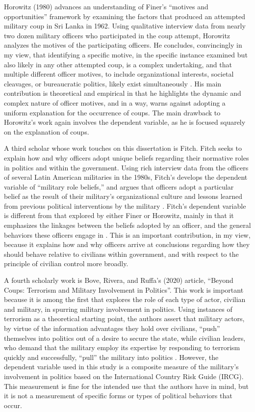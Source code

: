 \documentclass[
  12pt,
  oneside]{memoir}
\begin{document}
Horowitz (1980) advances an understanding of Finer's ``motives and opportunities'' framework by examining the factors that produced an attempted military coup in Sri Lanka in 1962. Using qualitative interview data from nearly two dozen military officers who participated in the coup attempt, Horowitz analyzes the motives of the participating officers. He concludes, convincingly in my view, that identifying a specific motive, in the specific instance examined but also likely in any other attempted coup, is a complex undertaking, and that multiple different officer motives, to include organizational interests, societal cleavages, or bureaucratic politics, likely exist simultaneously \autocite[3-30, 179-221]{horowitz_coup_1980}. His main contribution is theoretical and empirical in that he highlights the dynamic and complex nature of officer motives, and in a way, warns against adopting a uniform explanation for the occurrence of coups. The main drawback to Horowitz's work again involves the dependent variable, as he is focused squarely on the explanation of coups.

A third scholar whose work touches on this dissertation is Fitch. Fitch seeks to explain how and why officers adopt unique beliefs regarding their normative roles in politics and within the government. Using rich interview data from the officers of several Latin American militaries in the 1980s, Fitch's develops the dependent variable of ``military role beliefs,'' and argues that officers adopt a particular belief as the result of their military's organizational culture and lessons learned from previous political interventions by the military \autocite[61-105]{fitch_armed_1998}. Fitch's dependent variable is different from that explored by either Finer or Horowitz, mainly in that it emphasizes the linkages between the beliefs adopted by an officer, and the general behaviors these officers engage in \autocite[see especially][65-100]{fitch_armed_1998}. This is an important contribution, in my view, because it explains how and why officers arrive at conclusions regarding how they should behave relative to civilians within government, and with respect to the principle of civilian control more broadly.

A fourth scholarly work is Bove, Rivera, and Ruffa's (2020) article, ``Beyond Coups: Terrorism and Military Involvement in Politics''. This work is important because it is among the first that explores the role of each type of actor, civilian and military, in spurring military involvement in politics. Using instances of terrorism as a theoretical starting point, the authors assert that military actors, by virtue of the information advantages they hold over civilians, ``push'' themselves into politics out of a desire to secure the state, while civilian leaders, who demand that the military employ its expertise by responding to terrorism quickly and successfully, ``pull'' the military into politics \autocite[268]{bove_beyond_2020}. However, the dependent variable used in this study is a composite measure of the military's involvement in politics based on the International Country Risk Guide (IRCG). This measurement is fine for the intended use that the authors have in mind, but it is not a measurement of specific forms or types of political behaviors that occur.
\end{document}
